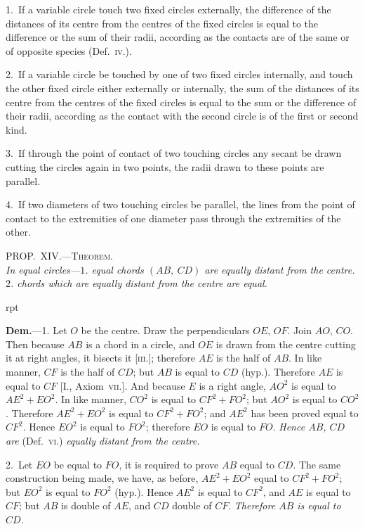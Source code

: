 \documentclass[oneside]{book}
\newcommand\myprop[2]{
\bigskip\Needspace*{4\baselineskip}\begin{center}\textsc{#1}\\\medskip\emph{#2}\par\end{center}
}
\newcommand\imgflow[3]{
\setcounter{wrapwidth}{#1}
\begin{wrapfigure}[#2]{r}{\value{wrapwidth}pt}
\begin{center}
\vspace{-0.3in}
\end{center}
\end{wrapfigure}
}
\begin{document}
\begin{footnotesize}
1.~If a variable circle touch two fixed circles externally, the
difference of the distances of its centre from the centres of the
fixed circles is equal to the difference or the sum of their radii,
according as the contacts are of the same or of opposite species
(Def.~\textsc{iv.}).

2.~If a variable circle be touched by one of two fixed circles
internally, and touch the other fixed circle either externally or
internally, the sum of the distances of its centre from the centres
of the fixed circles is equal to the sum or the difference of their
radii, according as the contact with the second circle is of the first
or second kind.

3.~If through the point of contact of two touching circles any
secant be drawn cutting the circles again in two points, the radii
drawn to these points are parallel.

4.~If two diameters of two touching circles be parallel, the
lines from the point of contact to the extremities of one diameter
pass through the extremities of the other.
\par\end{footnotesize}

\myprop{PROP\@.~XIV\@.---Theorem.}{In equal circles---$1$. equal chords $(AB,\ CD)$ are equally
distant from the centre. $2$. chords which are equally
distant from the centre are equal.}

\imgflow{108}{10}{f119}

\textbf{Dem.}---1. Let $O$ be the centre. Draw the perpendiculars
$OE$, $OF$. Join $AO$, $CO$.
Then because $AB$ is a chord in a
circle, and $OE$ is drawn from the
centre cutting it at right angles,
it bisects it [\textsc{iii.}]; therefore $AE$
is the half of $AB$. In like manner,
$CF$ is the half of $CD$; but $AB$
is equal to $CD$ (hyp.). Therefore
$AE$ is equal to $CF$ [I., Axiom~\textsc{vii.}].
And because $E$ is a right angle, $AO^{2}$ is equal to $AE^{2}
+ EO^{2}$. In like manner, $CO^{2}$ is equal to $CF^{2} + FO^{2}$;
but $AO^{2}$ is equal to $CO^{2}$. Therefore $AE^{2} + EO^{2}$ is
equal to $CF^{2} + FO^{2}$; and $AE^{2}$ has been proved equal to
$CF^{2}$. Hence $EO^{2}$ is equal to $FO^{2}$; therefore $EO$ is
equal to $FO$. \textit{Hence $AB$, $CD$ are} (Def.~\textsc{vi.}) \textit{equally
distant from the centre.}

2.~Let $EO$ be equal to $FO$, it is required to prove $AB$
equal to $CD$. The same construction being made, we
have, as before, $AE^{2} + EO^{2}$ equal to $CF^{2} + FO^{2}$; but $EO^{2}$
is equal to $FO^{2}$ (hyp.). Hence $AE^{2}$ is equal to $CF^{2}$,
and $AE$ is equal to $CF$; but $AB$ is double of $AE$, and
$CD$ double of $CF$. \emph{Therefore $AB$ is equal to $CD$.}
\end{document}
